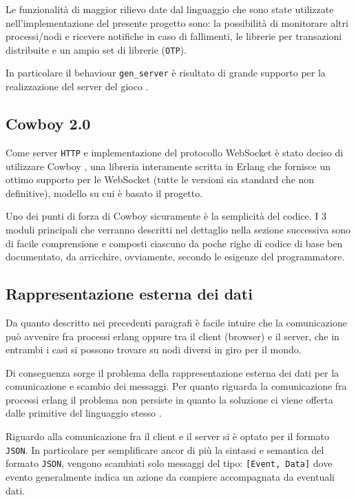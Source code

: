 \documentclass[paper=a4, fontsize=11pt]{scrartcl} %
\numberwithin{equation}{section} %
\numberwithin{figure}{section} %
\numberwithin{table}{section} %
\begin{document}
Le funzionalità di maggior rilievo date dal linguaggio che sono state utilizzate nell'implementazione del presente progetto sono: la possibilità di monitorare 
altri processi/nodi e ricevere notifiche in caso di fallimenti, le librerie per transazioni distribuite e
un ampio set di librerie (\texttt{OTP}).

In particolare il behaviour \texttt{gen\_server} è risultato
di grande supporto per la realizzazione del server del gioco \cite{erlang-monitor, erlang-supervisor, erlang-mnesia, erlang-gen-server}.


\subsection{Cowboy 2.0}
Come server \texttt{HTTP} e implementazione del protocollo WebSocket  è stato deciso di utilizzare Cowboy \cite{cowboy}, una libreria interamente scritta in Erlang che fornisce un ottimo supporto per le WebSocket (tutte le versioni sia standard che non definitive), modello su cui è basato il progetto.

Uno dei punti di forza di Cowboy sicuramente è la semplicità del codice. I 3 moduli principali che verranno descritti nel dettaglio nella sezione successiva sono di facile comprensione e composti ciascuno da poche righe di codice di base ben documentato, da arricchire, ovviamente, secondo le esigenze del programmatore.

\subsection{Rappresentazione esterna dei dati}
Da quanto descritto nei precedenti paragrafi è facile intuire che la comunicazione può avvenire fra processi erlang oppure tra il client (browser) e il server, che in entrambi i casi si possono trovare su nodi diversi in giro per il mondo. 

Di conseguenza sorge il problema della rappresentazione esterna dei dati per
la comunicazione e scambio dei messaggi. Per quanto riguarda la comunicazione fra processi erlang il problema non persiste in quanto la soluzione ci viene offerta dalle primitive del linguaggio stesso \cite{erlang-edr}.

Riguardo alla comunicazione fra il client e il server si è optato per il formato \texttt{JSON}.
In particolare per semplificare ancor di più la sintassi e semantica del formato \texttt{JSON}, vengono scambiati solo
messaggi del tipo: \texttt{[Event, Data]} dove evento generalmente indica un azione da compiere accompagnata da eventuali dati.
\end{document}
